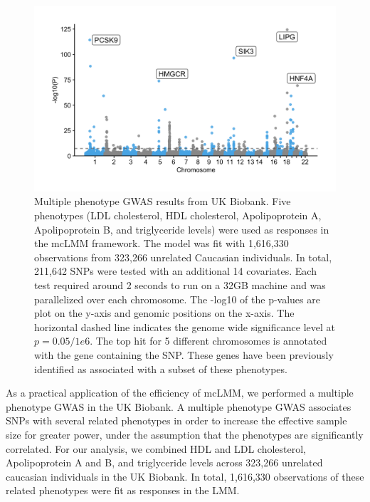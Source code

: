         \begin{figure}
            \centering
            \includegraphics[width=\textwidth]{chapter3/figures/Figure_6.png}
            \caption{Multiple phenotype GWAS results from UK Biobank. Five phenotypes (LDL cholesterol, HDL cholesterol, Apolipoprotein A, Apolipoprotein B, and triglyceride levels) were used as responses in the mcLMM framework. The model was fit with 1,616,330 observations from 323,266 unrelated Caucasian individuals. In total, 211,642 SNPs were tested with an additional 14 covariates. Each test required around 2 seconds to run on a 32GB machine and was parallelized over each chromosome. The -log10 of the p-values are plot on the y-axis and genomic positions on the x-axis. The horizontal dashed line indicates the genome wide significance level at $p=0.05/1e6$. The top hit for 5 different chromosomes is annotated with the gene containing the SNP. These genes have been previously identified as associated with a subset of these phenotypes.}
            \label{fig:fig3.6}
        \end{figure}
        
        As a practical application of the efficiency of mcLMM, we performed a multiple phenotype GWAS in the UK Biobank. A multiple phenotype GWAS associates SNPs with several related phenotypes in order to increase the effective sample size for greater power, under the assumption that the phenotypes are significantly correlated. For our analysis, we combined HDL and LDL cholesterol, Apolipoprotein A and B, and triglyceride levels across 323,266 unrelated caucasian individuals in the UK Biobank. In total, 1,616,330 observations of these related phenotypes were fit as responses in the LMM. 
        
